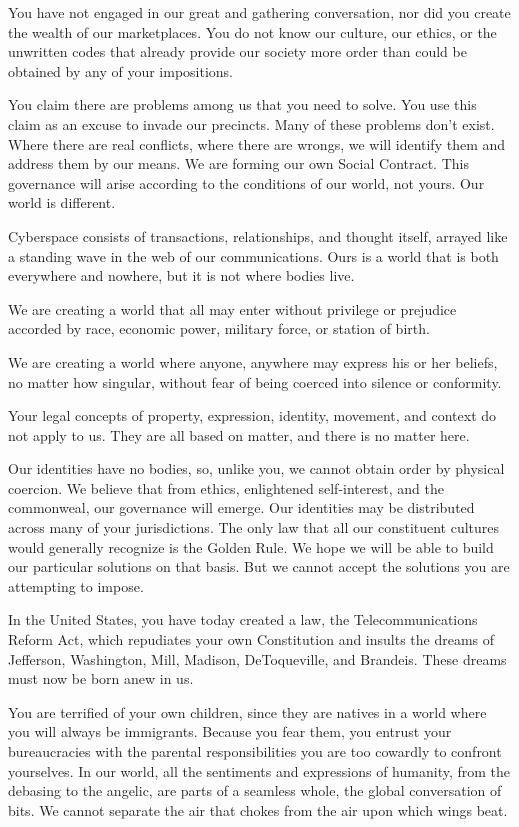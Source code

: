 \documentclass[letterpaper,12pt,english]{sphinxmanual}
\begin{document}
You have not engaged in our great and gathering conversation, nor did you create the wealth of our marketplaces. You do not know our culture, our ethics, or the unwritten codes that already provide our society more order than could be obtained by any of your impositions.

You claim there are problems among us that you need to solve. You use this claim as an excuse to invade our precincts. Many of these problems don't exist. Where there are real conflicts, where there are wrongs, we will identify them and address them by our means. We are forming our own Social Contract. This governance will arise according to the conditions of our world, not yours. Our world is different.

Cyberspace consists of transactions, relationships, and thought itself, arrayed like a standing wave in the web of our communications. Ours is a world that is both everywhere and nowhere, but it is not where bodies live.

We are creating a world that all may enter without privilege or prejudice accorded by race, economic power, military force, or station of birth.

We are creating a world where anyone, anywhere may express his or her beliefs, no matter how singular, without fear of being coerced into silence or conformity.

Your legal concepts of property, expression, identity, movement, and context do not apply to us. They are all based on matter, and there is no matter here.

Our identities have no bodies, so, unlike you, we cannot obtain order by physical coercion. We believe that from ethics, enlightened self-interest, and the commonweal, our governance will emerge. Our identities may be distributed across many of your jurisdictions. The only law that all our constituent cultures would generally recognize is the Golden Rule. We hope we will be able to build our particular solutions on that basis. But we cannot accept the solutions you are attempting to impose.

In the United States, you have today created a law, the Telecommunications Reform Act, which repudiates your own Constitution and insults the dreams of Jefferson, Washington, Mill, Madison, DeToqueville, and Brandeis. These dreams must now be born anew in us.

You are terrified of your own children, since they are natives in a world where you will always be immigrants. Because you fear them, you entrust your bureaucracies with the parental responsibilities you are too cowardly to confront yourselves. In our world, all the sentiments and expressions of humanity, from the debasing to the angelic, are parts of a seamless whole, the global conversation of bits. We cannot separate the air that chokes from the air upon which wings beat.
\end{document}
